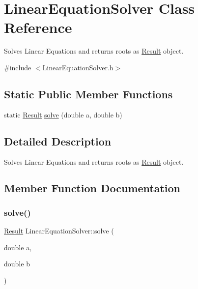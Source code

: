 \hypertarget{classLinearEquationSolver}{}\section{Linear\+Equation\+Solver Class Reference}
\label{classLinearEquationSolver}


Solves Linear Equations and returns roots as \hyperlink{classResult}{Result} object.  




{\ttfamily \#include $<$Linear\+Equation\+Solver.\+h$>$}

\subsection*{Static Public Member Functions}
\begin{DoxyCompactItemize}
\item 
static \hyperlink{classResult}{Result} \hyperlink{classLinearEquationSolver_a3b7f823c5d7698b243a5ba7c527fc689}{solve} (double a, double b)
\end{DoxyCompactItemize}


\subsection{Detailed Description}
Solves Linear Equations and returns roots as \hyperlink{classResult}{Result} object. 

\subsection{Member Function Documentation}
\mbox{\label{classLinearEquationSolver_a3b7f823c5d7698b243a5ba7c527fc689}} 
\subsubsection{\texorpdfstring{solve()}{solve()}}
{\footnotesize\ttfamily \hyperlink{classResult}{Result} Linear\+Equation\+Solver\+::solve (\begin{DoxyParamCaption}\item[{double}]{a,  }\item[{double}]{b }\end{DoxyParamCaption})\hspace{0.3cm}{\ttfamily [static]}}


